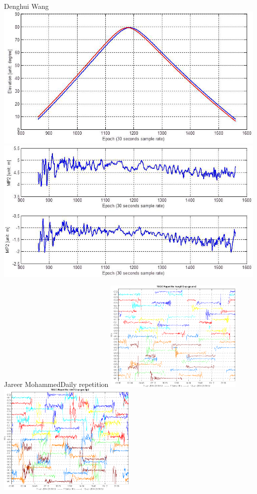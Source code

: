 \documentclass[11pt]{beamer}
\begin{document}
\begin{frame}{Denghui Wang}%
	\centering
	\includegraphics[height=.35\textheight]{pic/DW_reporbits.png}
	\includegraphics[height=.4\textheight]{pic/DW_mp.png} 
\end{frame}

\begin{frame}{Jareer Mohammed}{Daily repetition}
	\centering
	\includegraphics[width=0.5\textwidth]{pic/hung012_qc_gps_mp2.png}
	\includegraphics[width=0.5\textwidth]{pic/kiln012_qc_gps_mp2.png}
\end{frame}
\end{document}
